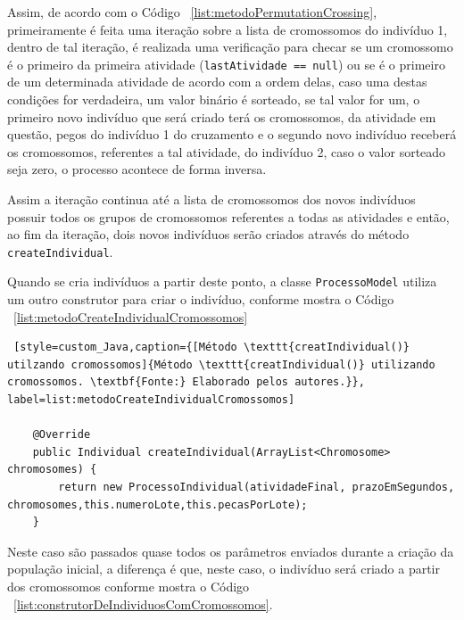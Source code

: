 \par Assim, de acordo com o Código ~\ref{list:metodoPermutationCrossing}, primeiramente é feita uma iteração sobre a lista de cromossomos do indivíduo 1, dentro de tal iteração, é realizada uma verificação para checar se um cromossomo é o primeiro da primeira atividade (\texttt{lastAtividade == null}) ou se é o primeiro de um determinada atividade de acordo com a ordem delas, caso uma destas condições for verdadeira, um valor binário é sorteado, se tal valor for um, o primeiro novo indivíduo que será criado terá os cromossomos, da atividade em questão, pegos do indivíduo 1 do cruzamento e o segundo novo indivíduo receberá os cromossomos, referentes a tal atividade, do indivíduo 2, caso o valor sorteado seja zero, o processo acontece de forma inversa. 

\par Assim a iteração continua até a lista de cromossomos dos novos indivíduos possuir todos os grupos de cromossomos referentes a todas as atividades e então, ao fim da iteração, dois novos indivíduos serão criados através do método \texttt{createIndividual}.

\par Quando se cria indivíduos a partir deste ponto, a classe \texttt{ProcessoModel} utiliza um outro construtor para criar o indivíduo, conforme mostra o Código ~\ref{list:metodoCreateIndividualCromossomos}


\begin{lstlisting} [style=custom_Java,caption={[Método \texttt{creatIndividual()} utilzando cromossomos]{Método \texttt{creatIndividual()} utilizando cromossomos. \textbf{Fonte:} Elaborado pelos autores.}}, label=list:metodoCreateIndividualCromossomos] 

	@Override
	public Individual createIndividual(ArrayList<Chromosome> chromosomes) {
		return new ProcessoIndividual(atividadeFinal, prazoEmSegundos, chromosomes,this.numeroLote,this.pecasPorLote);
	}

\end{lstlisting}

\par Neste caso são passados quase todos os parâmetros enviados durante a criação
da população inicial, a diferença é que, neste caso, o indivíduo será criado a partir 
dos cromossomos conforme mostra o Código ~\ref{list:construtorDeIndividuosComCromossomos}.

